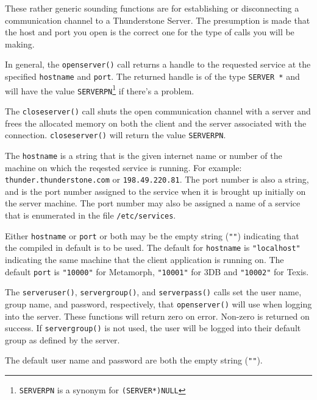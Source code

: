 \DESCRIPTION

These rather generic sounding functions are for establishing or
disconnecting a communication channel to a Thunderstone Server.  The
presumption is made that the host and port you open is the correct one for
the type of calls you will be making.

In general, the \verb`openserver()` call returns a handle to the requested
service at the specified \verb`hostname` and \verb`port`.  The returned
handle is of the type \verb`SERVER *` and will have the value
\verb`SERVERPN`\footnote{\verb`SERVERPN` is a synonym for \verb`(SERVER*)NULL`} if there's a problem.

The \verb`closeserver()` call shuts the open communication channel with
a server and frees the allocated memory on both the client and the
server associated with the connection. \verb`closeserver()` will
return the value \verb`SERVERPN`.

The \verb`hostname` is a string that is the given internet name
or number of the machine on which the reqested service is running.
For example: \verb`thunder.thunderstone.com` or \verb`198.49.220.81`.
The port number is also a string, and is the port number assigned to
the service when it is brought up initially on the server machine. The
port number may also be assigned a name of a service that is enumerated
in the file \verb`/etc/services`.

Either \verb`hostname` or \verb`port` or both may be the empty string
(\verb`""`) indicating that the compiled in default is to be used.  The
default for \verb`hostname` is \verb`"localhost"` indicating the same
machine that the client application is running on.  The default
\verb`port` is \verb`"10000"` for Metamorph, \verb`"10001"` for 3DB
and \verb`"10002"` for Texis.

The \verb`serveruser()`, \verb`servergroup()`, and \verb`serverpass()`
calls set the user name, group name, and password, respectively, that
\verb`openserver()` will use when logging into the server.  These
functions will return zero on error.  Non-zero is returned on success.
If \verb`servergroup()` is not used, the user will be logged into their
default group as defined by the server.

The default user name and password are both the empty string (\verb`""`).


